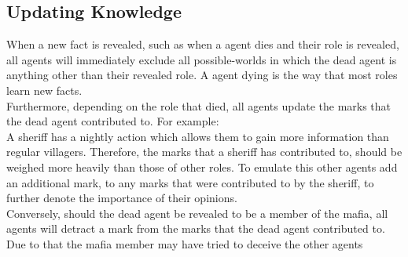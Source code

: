 \subsection{Updating Knowledge}\label{UpdatingKnowledge}
When a new fact is revealed, such as when a agent dies and their role is
revealed, all agents will immediately exclude all possible-worlds in which the
dead agent is anything other than their revealed role. A agent dying is the way
that most roles learn new facts.\\ Furthermore, depending on the role that
died, all agents update the marks that the dead agent contributed to. For
example:\\ A sheriff has a nightly action which allows them to gain more
information than regular villagers. Therefore, the marks that a sheriff has
contributed to, should be weighed more heavily than those of other roles. To
emulate this other agents add an additional mark, to any marks that were
contributed to by the sheriff, to further denote the importance of their
opinions. \\ Conversely, should the dead agent be revealed to be a member of
the mafia, all agents will detract a mark from the marks that the dead agent
contributed to. Due to that the mafia member may have tried to deceive the
other agents
